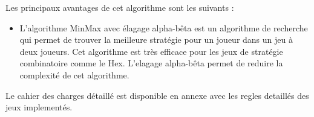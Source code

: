 Les principaux avantages de cet algorithme sont les suivants :
\begin{itemize}
	\item L'algorithme MinMax avec élagage alpha-bêta est un algorithme de recherche
	qui permet de trouver la meilleure stratégie pour un joueur dans un jeu à deux
	joueurs. Cet algorithme est très efficace pour les jeux de stratégie combinatoire
	comme le Hex. L'elagage alpha-bêta permet de reduire la complexité de cet algorithme.
\end{itemize}

Le cahier des charges détaillé est disponible en annexe avec les regles detaillés des jeux implementés.
